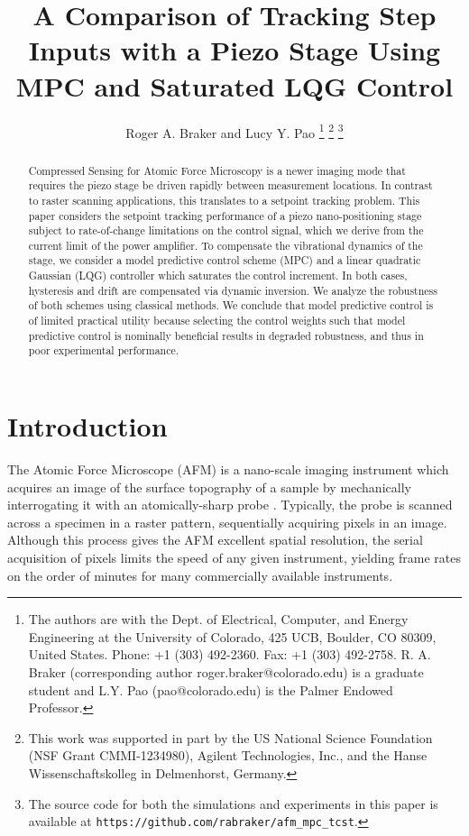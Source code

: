 \documentclass[twocolumn,twoside]{IEEEtran}
\begin{document}
\title{A Comparison of Tracking Step Inputs with a Piezo Stage Using MPC and Saturated LQG Control}
\author{Roger A. Braker and Lucy Y. Pao
  \thanks{The authors are with the Dept. of Electrical, Computer, and Energy Engineering at the University of Colorado, 425 UCB, Boulder, CO 80309, United States. Phone: +1 (303) 492-2360. Fax: +1 (303) 492-2758.
    R. A.  Braker (corresponding author roger.braker@colorado.edu) is a graduate student and
    L.Y. Pao (pao@colorado.edu) is the Palmer Endowed Professor.}
  \thanks{This work was supported in part by the US National Science Foundation (NSF Grant CMMI-1234980), Agilent Technologies, Inc., and the Hanse Wissenschaftskolleg in Delmenhorst, Germany.}
  \thanks{The source code for both the simulations and experiments in this paper is available at \texttt{https://github.com/rabraker/afm\_mpc\_tcst}.}
}

\maketitle
\begin{abstract}
  Compressed Sensing for Atomic Force Microscopy is a newer imaging mode that requires the piezo stage be driven rapidly between measurement locations. In contrast to raster scanning applications, this translates to a setpoint tracking problem. 
  This paper considers the setpoint tracking performance of a piezo nano-positioning stage subject to rate-of-change limitations on the control signal, which we derive from the current limit of the power amplifier.
To compensate the vibrational dynamics of the stage, we consider a model predictive control scheme (MPC) and a linear quadratic Gaussian (LQG) controller which saturates the control increment. In both cases, hysteresis and drift are compensated via dynamic inversion. We analyze the robustness of both schemes using classical methods. We conclude that model predictive control is of limited practical utility because selecting the control weights such that model predictive control is nominally beneficial results in degraded robustness, and thus in poor experimental performance.
\end{abstract}


\section{Introduction}\label{sec:intro}
The Atomic Force Microscope (AFM) is a nano-scale imaging instrument which acquires an image of the surface topography of a sample by mechanically interrogating it with an atomically-sharp probe \cite{abramovitch_tutorial_2007, rana_improvement_survey_2017}. Typically, the probe is scanned across a specimen in a raster pattern, sequentially acquiring pixels in an image. Although this process gives the AFM excellent spatial resolution, the serial acquisition of pixels limits the speed of any given instrument, yielding frame rates on the order of minutes for many commercially available instruments.
\end{document}
